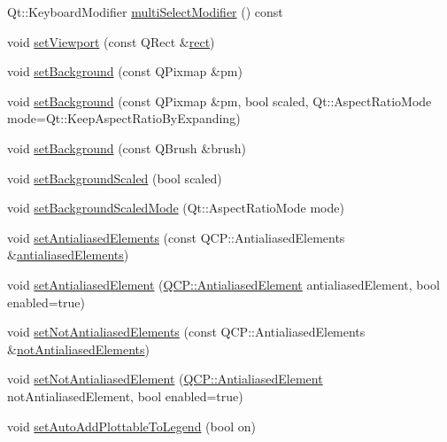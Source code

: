 \begin{DoxyCompactItemize}
Qt\+::\+Keyboard\+Modifier \hyperlink{class_q_custom_plot_a9b6b1a0fea8da3fda6d5e3d687202877}{multi\+Select\+Modifier} () const 
\item 
void \hyperlink{class_q_custom_plot_a3f9bc4b939dd8aaba9339fd09f273fc4}{set\+Viewport} (const Q\+Rect \&\hyperlink{_gen_blob_8m_aea8f6815d9a63491fc422c5572c6b3c3}{rect})
\item 
void \hyperlink{class_q_custom_plot_a130358592cfca353ff3cf5571b49fb00}{set\+Background} (const Q\+Pixmap \&pm)
\item 
void \hyperlink{class_q_custom_plot_a8513971d6aa24d8b0d6a68d45b542130}{set\+Background} (const Q\+Pixmap \&pm, bool scaled, Qt\+::\+Aspect\+Ratio\+Mode mode=Qt\+::\+Keep\+Aspect\+Ratio\+By\+Expanding)
\item 
void \hyperlink{class_q_custom_plot_a8ed256cf467bfa7ba1f9feaae62c3bd0}{set\+Background} (const Q\+Brush \&brush)
\item 
void \hyperlink{class_q_custom_plot_a36f0fa1317325dc7b7efea615ee2de1f}{set\+Background\+Scaled} (bool scaled)
\item 
void \hyperlink{class_q_custom_plot_a4c0eb4865b7949f62e1cb97db04a3de0}{set\+Background\+Scaled\+Mode} (Qt\+::\+Aspect\+Ratio\+Mode mode)
\item 
void \hyperlink{class_q_custom_plot_af6f91e5eab1be85f67c556e98c3745e8}{set\+Antialiased\+Elements} (const Q\+C\+P\+::\+Antialiased\+Elements \&\hyperlink{class_q_custom_plot_a81e954fbb485bb44c609e5707f0067b3}{antialiased\+Elements})
\item 
void \hyperlink{class_q_custom_plot_aeef813bcf7efab8e765f9f87ec454691}{set\+Antialiased\+Element} (\hyperlink{namespace_q_c_p_ae55dbe315d41fe80f29ba88100843a0c}{Q\+C\+P\+::\+Antialiased\+Element} antialiased\+Element, bool enabled=true)
\item 
void \hyperlink{class_q_custom_plot_ae10d685b5eabea2999fb8775ca173c24}{set\+Not\+Antialiased\+Elements} (const Q\+C\+P\+::\+Antialiased\+Elements \&\hyperlink{class_q_custom_plot_a8060cee59757213764382a78d3196189}{not\+Antialiased\+Elements})
\item 
void \hyperlink{class_q_custom_plot_afc657938a707c890e449ae89203a076d}{set\+Not\+Antialiased\+Element} (\hyperlink{namespace_q_c_p_ae55dbe315d41fe80f29ba88100843a0c}{Q\+C\+P\+::\+Antialiased\+Element} not\+Antialiased\+Element, bool enabled=true)
\item 
void \hyperlink{class_q_custom_plot_ad8858410c2db47b7104040a3aa61c3fc}{set\+Auto\+Add\+Plottable\+To\+Legend} (bool on)
\item 

\end{DoxyCompactItemize}
